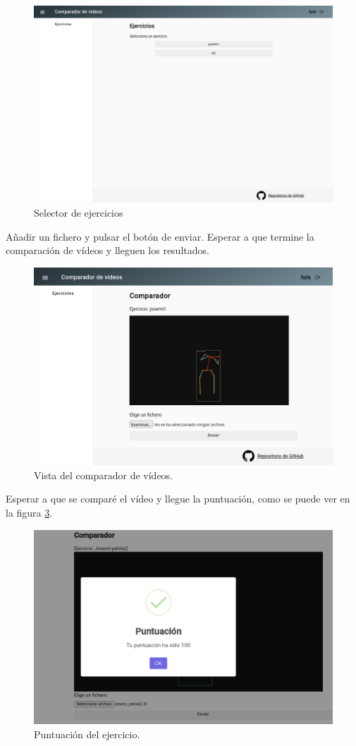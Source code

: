 \begin{figure}
	\centering
	\includegraphics[width=0.7\linewidth]{img/ManualDeUsuario/selectorDeEjercicio}
	\caption{Selector de ejercicios}
	\label{fig:selectordeejercicio}
\end{figure}


Añadir un fichero y pulsar el botón de enviar. Esperar a que termine la comparación de vídeos y lleguen los resultados.

\begin{figure}
	\centering
	\includegraphics[width=0.7\linewidth]{img/ManualDeUsuario/comparador}
	\caption{Vista del comparador de vídeos.}
	\label{fig:comparador}
\end{figure}
Esperar a que se comparé el vídeo y llegue la puntuación, como se puede ver en la figura \ref{fig:puntuacion}.
\begin{figure}
	\centering
	\includegraphics[width=0.7\linewidth]{img/ManualDeUsuario/puntuacion}
	\caption{Puntuación del ejercicio.}
	\label{fig:puntuacion}
\end{figure}

